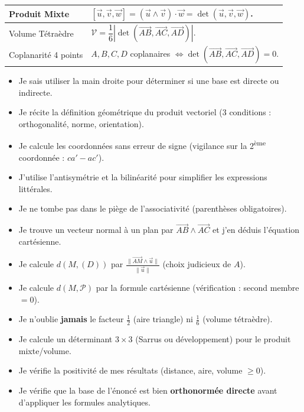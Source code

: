 \documentclass[11pt]{article}
\begin{document}
\begin{aretenir}
\begin{center}
\begin{tabularx}{\linewidth}{|l|X|}
\hline
Produit Mixte & $[\vec{u},\vec{v},\vec{w}]=(\vec{u}\wedge\vec{v})\cdot\vec{w}=\det(\vec{u},\vec{v},\vec{w})$. \\
\hline
Volume Tétraèdre & $\mathcal{V}=\dfrac{1}{6}|\det(\overrightarrow{AB},\overrightarrow{AC},\overrightarrow{AD})|$. \\
\hline
Coplanarité 4 points & $A,B,C,D$ coplanaires $\Leftrightarrow \det(\overrightarrow{AB},\overrightarrow{AC},\overrightarrow{AD})=0$. \\
\hline
\end{tabularx}
\end{center}
\end{aretenir}

\begin{aretenir}
\begin{itemize}
  \item[$\square$] Je sais utiliser la main droite pour déterminer si une base est directe ou indirecte.
  \item[$\square$] Je récite la définition géométrique du produit vectoriel (3 conditions : orthogonalité, norme, orientation).
  \item[$\square$] Je calcule les coordonnées sans erreur de signe (vigilance sur la 2\textsuperscript{ème} coordonnée : $ca'-ac'$).
  \item[$\square$] J'utilise l'antisymétrie et la bilinéarité pour simplifier les expressions littérales.
  \item[$\square$] Je ne tombe pas dans le piège de l'associativité (parenthèses obligatoires).
  \item[$\square$] Je trouve un vecteur normal à un plan par $\overrightarrow{AB}\wedge\overrightarrow{AC}$ et j'en déduis l'équation cartésienne.
  \item[$\square$] Je calcule $d(M,(D))$ par $\frac{\|\overrightarrow{AM}\wedge\vec{u}\|}{\|\vec{u}\|}$ (choix judicieux de $A$).
  \item[$\square$] Je calcule $d(M,\mathcal{P})$ par la formule cartésienne (vérification : second membre $=0$).
  \item[$\square$] Je n'oublie \textbf{jamais} le facteur $\frac{1}{2}$ (aire triangle) ni $\frac{1}{6}$ (volume tétraèdre).
  \item[$\square$] Je calcule un déterminant $3\times 3$ (Sarrus ou développement) pour le produit mixte/volume.
  \item[$\square$] Je vérifie la positivité de mes résultats (distance, aire, volume $\ge 0$).
  \item[$\square$] Je vérifie que la base de l'énoncé est bien \textbf{orthonormée directe} avant d'appliquer les formules analytiques.
\end{itemize}
\end{aretenir}
\end{document}

